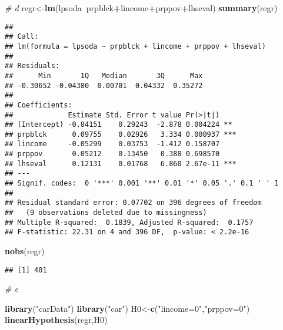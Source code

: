 \documentclass[]{article}
\newenvironment{Shaded}{\begin{snugshade}}{\end{snugshade}}
\newcommand{\CommentTok}[1]{\textcolor[rgb]{0.56,0.35,0.01}{\textit{#1}}}
\newcommand{\KeywordTok}[1]{\textcolor[rgb]{0.13,0.29,0.53}{\textbf{#1}}}
\newcommand{\NormalTok}[1]{#1}
\newcommand{\OperatorTok}[1]{\textcolor[rgb]{0.81,0.36,0.00}{\textbf{#1}}}
\newcommand{\StringTok}[1]{\textcolor[rgb]{0.31,0.60,0.02}{#1}}
\begin{document}
\begin{Shaded}
\begin{Highlighting}[]
\CommentTok{# d}
\NormalTok{regr<-}\KeywordTok{lm}\NormalTok{(lpsoda}\OperatorTok{~}\NormalTok{prpblck}\OperatorTok{+}\NormalTok{lincome}\OperatorTok{+}\NormalTok{prppov}\OperatorTok{+}\NormalTok{lhseval)}
\KeywordTok{summary}\NormalTok{(regr)}
\end{Highlighting}
\end{Shaded}

\begin{verbatim}
## 
## Call:
## lm(formula = lpsoda ~ prpblck + lincome + prppov + lhseval)
## 
## Residuals:
##      Min       1Q   Median       3Q      Max 
## -0.30652 -0.04380  0.00701  0.04332  0.35272 
## 
## Coefficients:
##             Estimate Std. Error t value Pr(>|t|)    
## (Intercept) -0.84151    0.29243  -2.878 0.004224 ** 
## prpblck      0.09755    0.02926   3.334 0.000937 ***
## lincome     -0.05299    0.03753  -1.412 0.158707    
## prppov       0.05212    0.13450   0.388 0.698570    
## lhseval      0.12131    0.01768   6.860 2.67e-11 ***
## ---
## Signif. codes:  0 '***' 0.001 '**' 0.01 '*' 0.05 '.' 0.1 ' ' 1
## 
## Residual standard error: 0.07702 on 396 degrees of freedom
##   (9 observations deleted due to missingness)
## Multiple R-squared:  0.1839, Adjusted R-squared:  0.1757 
## F-statistic: 22.31 on 4 and 396 DF,  p-value: < 2.2e-16
\end{verbatim}

\begin{Shaded}
\begin{Highlighting}[]
\KeywordTok{nobs}\NormalTok{(regr)}
\end{Highlighting}
\end{Shaded}

\begin{verbatim}
## [1] 401
\end{verbatim}

\begin{Shaded}
\begin{Highlighting}[]
\CommentTok{# e}

\KeywordTok{library}\NormalTok{(}\StringTok{"carData"}\NormalTok{)}
\KeywordTok{library}\NormalTok{(}\StringTok{"car"}\NormalTok{)}
\NormalTok{H0<-}\KeywordTok{c}\NormalTok{(}\StringTok{"lincome=0"}\NormalTok{,}\StringTok{"prppov=0"}\NormalTok{)}
\KeywordTok{linearHypothesis}\NormalTok{(regr,H0)}
\end{Highlighting}
\end{Shaded}
\end{document}
